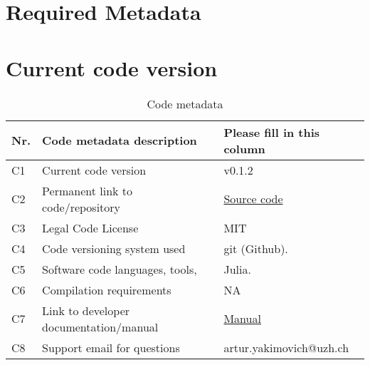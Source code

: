 \section{Required Metadata}

\section{Current code version}


\begin{table}
\begin{tabular}{lll}
\hline
\textbf{Nr.} & \textbf{Code metadata description} & \textbf{Please fill in this column} \\
\hline
C1 & Current code version & v0.1.2 \\
\hline
C2 & Permanent link to code/repository & \href{https://github.com/MatlabCompat/MatlabCompat.jl}{Source code} \\
\hline
C3 & Legal Code License   & MIT \\
\hline
C4 & Code versioning system used & git (Github). \\
\hline
C5 & Software code languages, tools, & Julia. \\
\hline
C6 & Compilation requirements & NA \\
\hline
C7 & Link to developer documentation/manual & \href{http://matlabcompat.github.io/help.html}{Manual}\\
\hline
C8 & Support email for questions & artur.yakimovich@uzh.ch\\
\hline
\end{tabular}
\caption{Code metadata}
\end{table}
  
  
  
  
  